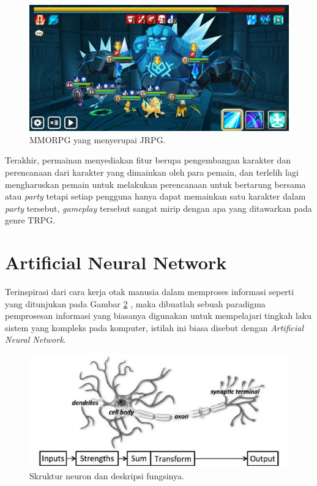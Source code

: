 \begin{figure} [!h] \centering
	\includegraphics[scale=0.26]{img/sw.jpg}
	\caption{MMORPG yang menyerupai JRPG.}
	\label{fig:sw}
\end{figure}

Terakhir, permainan menyediakan fitur berupa pengembangan karakter dan perencanaan dari karakter yang dimainkan oleh para pemain, dan terlelih lagi mengharuskan pemain untuk melakukan perencanaan untuk bertarung bersama atau \textit{party} tetapi setiap pengguna hanya dapat memainkan satu karakter dalam \textit{party} tersebut, \textit{gameplay} tersebut sangat mirip dengan apa yang ditawarkan pada genre TRPG.
\vspace{1ex}

\section{Artificial Neural Network}
\label{sec:sec2_ann}
\vspace{1ex}

Terinspirasi dari cara kerja otak manusia dalam memproses informasi seperti yang ditunjukan pada Gambar \ref{fig:ann_neuron} \citep{buduma2017}, maka dibuatlah sebuah paradigma pemprosesan informasi yang biasanya digunakan untuk mempelajari tingkah laku sistem yang kompleks pada komputer, istilah ini biasa disebut dengan \textit{Artificial Neural Network}.
\vspace{1ex}

\begin{figure} [!h] \centering
	\includegraphics[scale=0.65]{img/ann_neuron.png}
	\caption{Skruktur neuron dan deskripsi fungsinya.}
	\label{fig:ann_neuron}
\end{figure}


